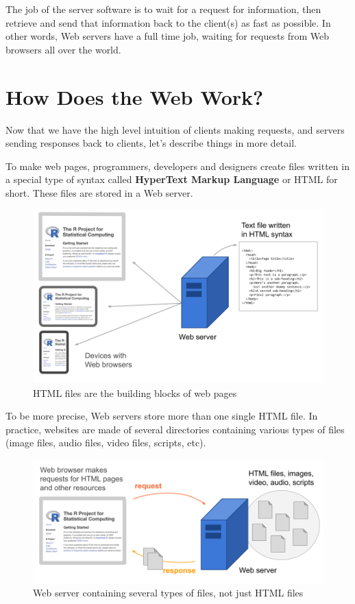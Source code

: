 \documentclass[
]{book}
\begin{document}
The job of the server software is to wait for a request for information, then
retrieve and send that information back to the client(s) as fast as possible.
In other words, Web servers have a full time job, waiting for requests from
Web browsers all over the world.

\hypertarget{how-does-the-web-work}{%
\section{How Does the Web Work?}\label{how-does-the-web-work}}

Now that we have the high level intuition of clients making requests, and
servers sending responses back to clients, let's describe things in more
detail.

To make web pages, programmers, developers and designers create files written
in a special type of syntax called \textbf{HyperText Markup Language} or HTML for
short. These files are stored in a Web server.

\begin{figure}

{\centering \includegraphics[width=0.8\linewidth]{images/http/web-scheme3} 

}

\caption{HTML files are the building blocks of web pages}\label{fig:unnamed-chunk-6}
\end{figure}

To be more precise, Web servers store more than one single HTML file. In
practice, websites are made of several directories containing various types of
files (image files, audio files, video files, scripts, etc).

\begin{figure}

{\centering \includegraphics[width=0.8\linewidth]{images/http/web-scheme5} 

}

\caption{Web server containing several types of files, not just HTML files}\label{fig:unnamed-chunk-7}
\end{figure}
\end{document}

